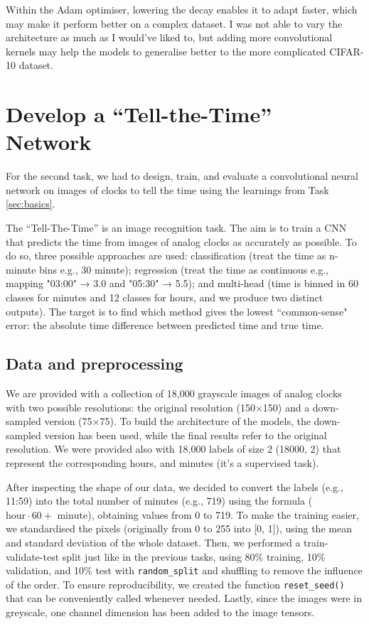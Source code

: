 \documentclass[a4paper]{article}
\begin{document}
Within the Adam optimiser, lowering the decay enables it to adapt faster, which may make it perform better on a complex dataset. I was not able to vary the architecture as much as I would've liked to, but adding more convolutional kernels may help the models to generalise better to the more complicated CIFAR-10 dataset. 

\section{Develop a ``Tell-the-Time'' Network}
For the second task, we had to design, train, and evaluate a convolutional neural network on images of clocks to tell the time using the learnings from Task \ref{sec:basics}.

The ``Tell-The-Time'' is an image recognition task. The aim is to train a CNN that predicts the time from images of analog clocks as accurately as possible. To do so, three possible approaches are used: classification (treat the time as n-minute bins e.g., 30 minute); regression (treat the time as continuous e.g., mapping "03:00" → 3.0 and "05:30" → 5.5); and multi-head (time is binned in 60 classes for minutes and 12 classes for hours, and we produce two distinct outputs). The target is to find which method gives the lowest ``common-sense" error: the absolute time difference between predicted time and true time. 

\subsection{Data and preprocessing}\label{sec:cnnselection}

We are provided with a collection of 18,000 grayscale images of analog clocks with two possible resolutions: the original resolution (150\(\times\)150) and a down-sampled version (75\(\times\)75). To build the architecture of the models, the down-sampled version has been used, while the final results refer to the original resolution. We were provided also with 18,000 labels of size 2 (18000, 2) that represent the corresponding hours, and minutes (it's a supervised task).

After inspecting the shape of our data, we decided to convert the labels (e.g., 11:59) into the total number of minutes (e.g., 719) using the formula (\(\text{hour}\cdot 60 + \text{ minute}\)), obtaining values from 0 to 719. To make the training easier, we standardised the pixels (originally from 0 to 255 into [0, 1]), using the mean and standard deviation of the whole dataset. Then, we performed a train-validate-test split just like in the previous tasks, using 80\% training, 10\% validation, and 10\% test with \texttt{random\_split} and shuffling to remove the influence of the order. To ensure reproducibility, we created the function \texttt{reset\_seed()} that can be conveniently called whenever needed. Lastly, since the images were in greyscale, one channel dimension has been added to the image tensors. 
\end{document}
